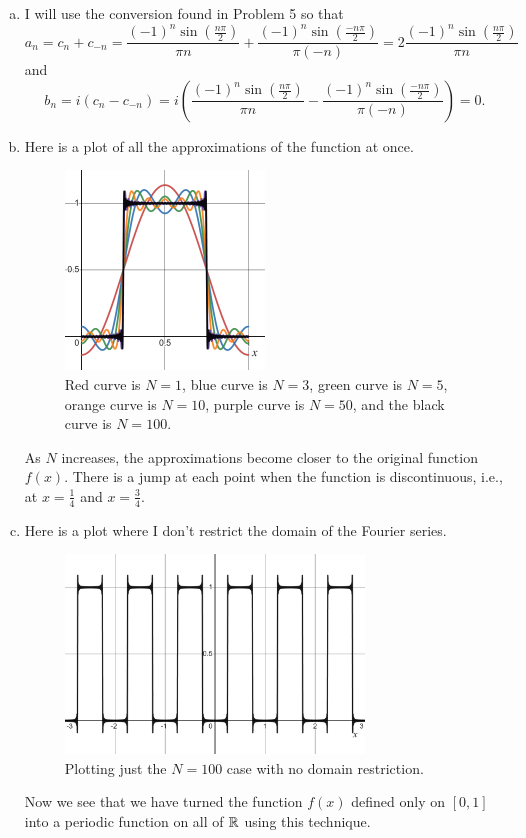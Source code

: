 \documentclass[12pt]{article} %
\begin{document}
\begin{solution}
\begin{enumerate}[(a)]
\item I will use the conversion found in Problem 5 so that
\[
a_n = c_n + c_{-n} = \frac{(-1)^n\sin\left(\frac{n \pi}{2}\right) }{\pi n} + \frac{(-1)^n\sin\left(\frac{-n \pi}{2}\right) }{\pi(-n)} = 2\frac{(-1)^n\sin\left(\frac{n \pi}{2}\right) }{\pi n}
\]
and
\[
b_n = i(c_n - c_{-n}) = i\left(\frac{(-1)^n\sin\left(\frac{n \pi}{2}\right) }{\pi n} - \frac{(-1)^n\sin\left(\frac{-n \pi}{2}\right) }{\pi (-n)}\right) = 0.
\]
\item Here is a plot of all the approximations of the function at once. 
\begin{figure}[H]
\centering
\includegraphics[width=0.5\textwidth]{figures/fourier_series.png}
\caption{Red curve is $N=1$, blue curve is $N=3$, green curve is $N=5$, orange curve is $N=10$, purple curve is $N=50$, and the black curve is $N=100$.}
\end{figure}
As $N$ increases, the approximations become closer to the original function $f(x)$. There is a jump at each point when the function is discontinuous, i.e., at $x=\frac{1}{4}$ and $x=\frac{3}{4}$.
\item Here is a plot where I don't restrict the domain of the Fourier series.
\begin{figure}[H]
\centering
\includegraphics[width=0.75\textwidth]{figures/fourier_series_on_R.png}
\caption{Plotting just the $N=100$ case with no domain restriction.}
\end{figure}
Now we see that we have turned the function $f(x)$ defined only on $[0,1]$ into a periodic function on all of $\mathbb{R}$ using this technique.
\end{enumerate}
\end{solution}
\end{document}
